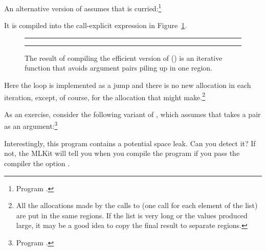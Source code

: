 \documentclass[12pt]{book}
\begin{document}
An alternative version of  assumes that  is
curried:\footnote{Program .}
It is compiled into the call-explicit expression in
Figure~\ref{fold2.fig}.
\begin{figure}
\hrule \medskip
{}
\caption{The result of compiling the efficient version of 
  () is an iterative function that avoids argument pairs
  piling up in one region.}  \medskip \hrule
\label{fold2.fig}
\end{figure}
Here the loop is implemented as a jump and there is no new allocation in each
iteration, except, of course, for the allocation that  might
make.\footnote{All the allocations made by the calls to  (one call for
each element of the list) are put in the same regions.  If the list is very long
or the values produced large, it may be a good idea to copy the final result to
separate regions.}

As an exercise, consider the following variant of , which assumes that
 takes a pair as an argument:\footnote{Program .}
Interestingly, this program contains a potential space leak. Can you detect it?
If not, the MLKit will tell you when you compile the program if you pass the
compiler the option .
\end{document}
